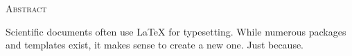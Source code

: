 \begin{center}
  \textsc{Abstract}
\end{center}
%
\noindent
%
Scientific documents often use \LaTeX{} for typesetting. While numerous
packages and templates exist, it makes sense to create a new one. Just
because.
